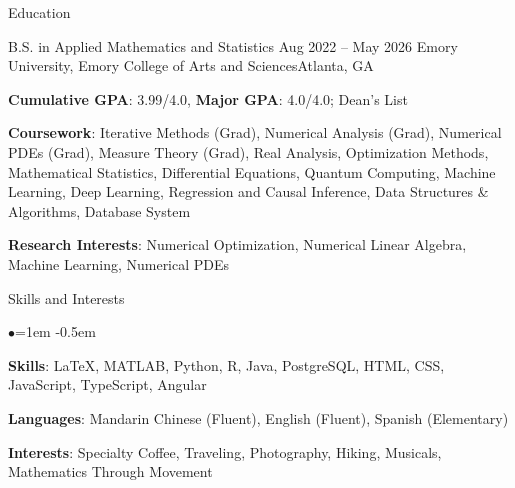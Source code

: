 \documentclass[10pt, letterpaper]{resume} %
\begin{document}
 
\begin{rSection}{Education}
\begin{rSubsection}
	{B.S. in Applied Mathematics and Statistics}
	{Aug 2022 -- May 2026}
	{Emory University, Emory College of Arts and Sciences}{Atlanta, GA}
	
	\item \textbf{Cumulative GPA}: 3.99/4.0, \textbf{Major GPA}: 4.0/4.0; Dean's List
	\item \textbf{Coursework}: Iterative Methods (Grad), Numerical Analysis (Grad), Numerical PDEs (Grad), Measure Theory (Grad), Real Analysis, Optimization Methods, Mathematical Statistics, Differential Equations, Quantum Computing, Machine Learning, Deep Learning, Regression and Causal Inference, Data Structures \& Algorithms, Database System
	\item \textbf{Research Interests}: Numerical Optimization, Numerical Linear Algebra, Machine Learning, Numerical PDEs
\end{rSubsection}
\end{rSection} 

\begin{rSection}{Skills and Interests}
\begin{list}{$\bullet$}{\leftmargin=1em}
   \itemsep -0.5em
  \item \textbf{Skills}: \LaTeX, MATLAB, Python,  R, Java, PostgreSQL, HTML, CSS, JavaScript, TypeScript, Angular
	\item \textbf{Languages}: Mandarin Chinese (Fluent), English (Fluent), Spanish (Elementary)
	\item \textbf{Interests}: Specialty Coffee, Traveling, Photography, Hiking, Musicals, Mathematics Through Movement 
  \end{list}
\end{rSection}
\end{document}
